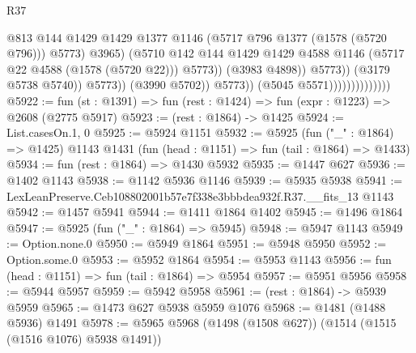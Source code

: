 \begin{lexlean}{R37}
\begin{coremodule}
                                                      @813
                                                      @144
                                                      @1429
                                                      @1429
                                                      @1377
                                                      @1146
                                                      (@5717 @796 @1377 (@1578 (@5720 @796)))
                                                      @5773)
                                                    @3965)
                                                  (@5710
                                                    @142
                                                    @144
                                                    @1429
                                                    @1429
                                                    @4588
                                                    @1146
                                                    (@5717 @22 @4588 (@1578 (@5720 @22)))
                                                    @5773))
                                                (@3983 @4898))
                                              @5773))
                                          (@3179 @5738 @5740))
                                        @5773))
                                    (@3990 @5702))
                                  @5773))
                              (@5045 @5571))))))))))))))
@5922 := fun (st : @1391) => fun (rest : @1424) => fun (expr : @1223) => @2608 (@2775 @5917)
@5923 := (rest : @1864) -> @1425
@5924 := List.casesOn.{1, 0}
@5925 := @5924 @1151
@5932 := @5925
    (fun ("_" : @1864) => @1425)
    @1143
    @1431
    (fun (head : @1151) => fun (tail : @1864) => @1433)
@5934 := fun (rest : @1864) => @1430 @5932
@5935 := @1447 @627
@5936 := @1402 @1143
@5938 := @1142 @5936 @1146
@5939 := @5935 @5938
@5941 := LexLeanPreserve.Ceb108802001b57e7f338e3bbbdea932f.R37.__fits_13 @1143
@5942 := @1457 @5941
@5944 := @1411 @1864 @1402
@5945 := @1496 @1864
@5947 := @5925 (fun ("_" : @1864) => @5945)
@5948 := @5947 @1143
@5949 := Option.none.{0}
@5950 := @5949 @1864
@5951 := @5948 @5950
@5952 := Option.some.{0}
@5953 := @5952 @1864
@5954 := @5953 @1143
@5956 := fun (head : @1151) => fun (tail : @1864) => @5954
@5957 := @5951 @5956
@5958 := @5944 @5957
@5959 := @5942 @5958
@5961 := (rest : @1864) -> @5939 @5959
@5965 := @1473 @627 @5938 @5959 @1076
@5968 := @1481 (@1488 @5936) @1491
@5978 := @5965 @5968 (@1498 (@1508 @627)) (@1514 (@1515 (@1516 @1076) @5938 @1491))

\end{coremodule}
\end{lexlean}
